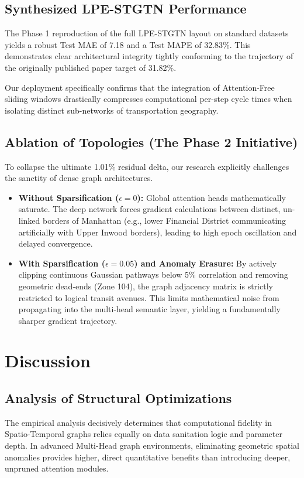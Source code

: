 \documentclass{rapportECL}
\begin{document}
\subsection{Synthesized LPE-STGTN Performance}
The Phase 1 reproduction of the full LPE-STGTN layout on standard datasets yields a robust Test MAE of 7.18 and a Test MAPE of 32.83\%. This demonstrates clear architectural integrity tightly conforming to the trajectory of the originally published paper target of 31.82\%. 

Our deployment specifically confirms that the integration of Attention-Free sliding windows drastically compresses computational per-step cycle times when isolating distinct sub-networks of transportation geography.

\subsection{Ablation of Topologies (The Phase 2 Initiative)}
To collapse the ultimate 1.01\% residual delta, our research explicitly challenges the sanctity of dense graph architectures.
\begin{itemize}
    \item \textbf{Without Sparsification ($\epsilon = 0$):} Global attention heads mathematically saturate. The deep network forces gradient calculations between distinct, un-linked borders of Manhattan (e.g., lower Financial District communicating artificially with Upper Inwood borders), leading to high epoch oscillation and delayed convergence.
    \item \textbf{With Sparsification ($\epsilon = 0.05$) and Anomaly Erasure:} By actively clipping continuous Gaussian pathways below 5\% correlation and removing geometric dead-ends (Zone 104), the graph adjacency matrix is strictly restricted to logical transit avenues. This limits mathematical noise from propagating into the multi-head semantic layer, yielding a fundamentally sharper gradient trajectory.
\end{itemize}

\section{Discussion}

\subsection{Analysis of Structural Optimizations}
The empirical analysis decisively determines that computational fidelity in Spatio-Temporal graphs relies equally on data sanitation logic and parameter depth. In advanced Multi-Head graph environments, eliminating geometric spatial anomalies provides higher, direct quantitative benefits than introducing deeper, unpruned attention modules.
\end{document}
